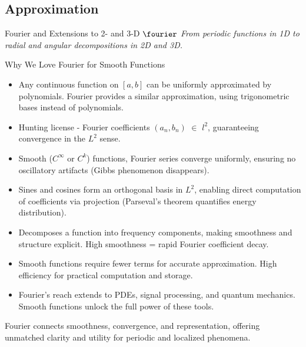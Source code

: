 \subsection{Approximation}
\begin{frame}{Fourier and Extensions to 2- and 3-D}
    \centering
    $\fourier$
    \vspace{1em}
    \textit{From periodic functions in 1D to radial and angular decompositions in 2D and 3D.}
\end{frame}
	
\begin{frame}{Why We Love Fourier for Smooth Functions}
    \begin{itemize}
        \item {} 
        Any continuous function on \([a, b]\) can be uniformly approximated by polynomials. Fourier provides a similar approximation, using trigonometric bases instead of polynomials.
        
        \item {} 
        Hunting license - Fourier coefficients \((a_n, b_n)\) $\in$ \(l^2\), guaranteeing convergence in the \(L^2\) sense.

        \item {} 
       Smooth (\(C^\infty\) or \(C^k\)) functions, Fourier series converge uniformly, ensuring no oscillatory artifacts (Gibbs phenomenon disappears).

        \item {} 
        Sines and cosines form an orthogonal basis in \(L^2\), enabling direct computation of coefficients via projection (Parseval's theorem quantifies energy distribution).

        \item {} 
        Decomposes a function into frequency components, making smoothness and structure explicit. High smoothness = rapid Fourier coefficient decay.

        \item {} 
        Smooth functions require fewer terms for accurate approximation. High efficiency for practical computation and storage.

        \item {} 
        Fourier's reach extends to PDEs, signal processing, and quantum mechanics. Smooth functions unlock the full power of these tools.
    \end{itemize}
    \vspace{1em}
     Fourier connects smoothness, convergence, and representation, offering unmatched clarity and utility for periodic and localized phenomena.
\end{frame}

